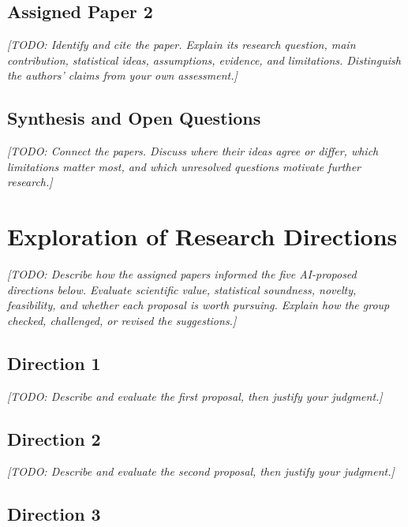 \documentclass[11pt,letterpaper]{article}
\newcommand{\placeholder}[1]{\textit{[TODO: #1]}}
\begin{document}
\subsection{Assigned Paper 2}

\placeholder{Identify and cite the paper. Explain its research question, main
contribution, statistical ideas, assumptions, evidence, and limitations. Distinguish
the authors' claims from your own assessment.}

\subsection{Synthesis and Open Questions}

\placeholder{Connect the papers. Discuss where their ideas agree or differ,
which limitations matter most, and which unresolved questions motivate further
research.}

\section{Exploration of Research Directions}
\label{sec:directions}

\placeholder{Describe how the assigned papers informed the five AI-proposed
directions below. Evaluate scientific value, statistical soundness, novelty,
feasibility, and whether each proposal is worth pursuing. Explain how the group
checked, challenged, or revised the suggestions.}

\subsection{Direction 1}

\placeholder{Describe and evaluate the first proposal, then justify your judgment.}

\subsection{Direction 2}

\placeholder{Describe and evaluate the second proposal, then justify your judgment.}

\subsection{Direction 3}
\end{document}
